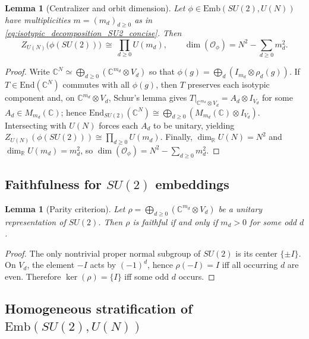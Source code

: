 \documentclass{article}%
\newtheorem{lemma}[theorem]{Lemma}
\theoremstyle{definition}
\numberwithin{equation}{section}
\newcommand{\R}{\mathbb{R}}
\newcommand{\C}{\mathbb{C}}
\newcommand{\End}{\mathrm{End}}
\newcommand{\Emb}{\mathrm{Emb}}
\begin{document}
\begin{lemma}[Centralizer and orbit dimension]\label{lem:centralizer_SU2_concise2}
Let $\phi\in\Emb(SU(2),U(N))$ have multiplicities $m=(m_d)_{d\ge0}$ as in \eqref{eq:isotypic_decomposition_SU2_concise}.
Then
\[
Z_{U(N)}\!\big(\phi(SU(2))\big)\ \cong\ \prod_{d\ge0} U(m_d),
\qquad
\dim(\mathcal O_\phi)=N^2-\sum_{d\ge0} m_d^2.
\]
\end{lemma}

\begin{proof}
Write $\C^N\simeq\bigoplus_{d\ge0}(\C^{m_d}\otimes V_d)$ so that $\phi(g)=\bigoplus_{d}(I_{m_d}\otimes \rho_d(g))$.
If $T\in\End(\C^N)$ commutes with all $\phi(g)$, then $T$ preserves each isotypic component and, on $\C^{m_d}\otimes V_d$,
Schur's lemma gives $T|_{\C^{m_d}\otimes V_d}=A_d\otimes I_{V_d}$ for some $A_d\in M_{m_d}(\C)$; hence
$\End_{SU(2)}(\C^N)\cong\bigoplus_{d\ge0}(M_{m_d}(\C)\otimes I_{V_d})$.
Intersecting with $U(N)$ forces each $A_d$ to be unitary, yielding
$Z_{U(N)}(\phi(SU(2)))\cong\prod_{d\ge0}U(m_d)$.
Finally, $\dim_\R U(N)=N^2$ and $\dim_\R U(m_d)=m_d^2$, so
$\dim(\mathcal O_\phi)=N^2-\sum_{d\ge0}m_d^2$.
\end{proof}

\subsection{Faithfulness for $SU(2)$ embeddings}
\label{subsec:Emb_SU2_faithfulness_concise}

\begin{lemma}[Parity criterion]\label{lem:faithfulness_SU2_parity_concise2}
Let $\rho=\bigoplus_{d\ge0}(\C^{m_d}\otimes V_d)$ be a unitary representation of $SU(2)$.
Then $\rho$ is faithful if and only if $m_d>0$ for some odd $d$.
\end{lemma}

\begin{proof}
The only nontrivial proper normal subgroup of $SU(2)$ is its center $\{\pm I\}$.
On $V_d$, the element $-I$ acts by $(-1)^d$, hence $\rho(-I)=I$ iff all occurring $d$ are even. Therefore $\ker(\rho)=\{I\}$ iff some
odd $d$ occurs.
\end{proof}

\subsection{Homogeneous stratification of $\Emb(SU(2),U(N))$}
\label{subsec:Emb_SU2_stratification_concise}
\end{document}
